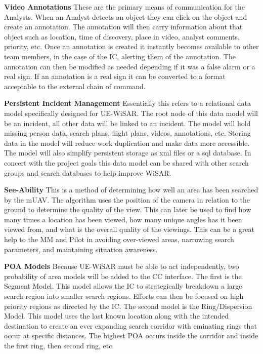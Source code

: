 \documentclass[12pt]{IEEEtran}
\begin{document}
\textbf{Video Annotations}  These are the primary means of communication for the
Analysts.  When an Analyst detects an object they can click on the object and
create an annotation.  The annotation will then carry information about that
object such as location, time of discovery, place in video, analyst comments,
priority, etc.  Once an annotation is created it instantly becomes
available to other team members, in the case of the IC, alerting them of the
annotation.  The annotation can then be modified as needed depending if it was a
false alarm or a real sign.  If an annotation is a real sign it can be converted
to a format acceptable to the external chain of command.

\textbf{Persistent Incident Management}  Essentially this refers to a relational
data model specifically designed for UE-WiSAR.  The root node of this data model
will be an incident, all other data will be linked to an incident.  The model
will hold missing person data, search plans, flight plans, videos, annotations,
etc.  Storing data in the model will reduce work duplication and make
data more accessible.  The model will also simplify persistent storage as xml
files or a sql database.  In concert with the project goals this data model can
be shared with other search groups and search databases to help improve WiSAR.

\textbf{See-Ability} \cite{engh2008see}  This is a method of determining how
well an area has been searched by the mUAV.  The algorithm uses the position of the
camera in relation to the ground to determine the quality of the view.  This can
later be used to find how many times a location has been viewed, how many unique
angles has it been viewed from, and what is the overall quality of the viewings.
This can be a great help to the MM and Pilot in avoiding over-viewed areas,
narrowing search parameters, and maintaining situation awareness.

\textbf{POA Models} \cite{koester2008lostpersons}  Because UE-WiSAR must
be able to act independently, two probability of area models will be added
to the CC interface.  The first is the Segment Model.  This model allows the IC
to strategically breakdown a large search region into smaller search regions. 
Efforts can then be focused on high priority regions as directed by the IC.  The
second model is the Ring/Dispersion Model.  This model uses the last known
location along with the intended destination to create an ever expanding search
corridor with eminating rings that occur at specific distances.  The
highest POA occurs inside the corridor and inside the first ring, then second
ring, etc.
\end{document}
